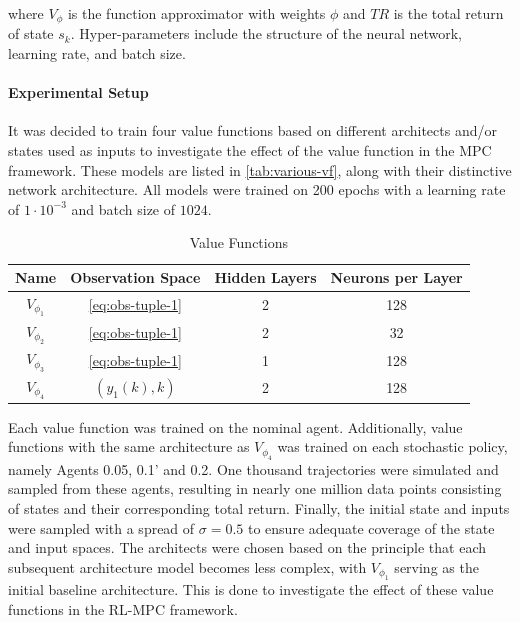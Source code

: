 where $V_{\phi}$ is the function approximator with weights $\phi$ and $TR$ is the total return of state $s_k$. Hyper-parameters include the structure of the neural network, learning rate, and batch size.\\



\paragraph{Experimental Setup}
It was decided to train four value functions based on different architects and/or states used as inputs to investigate the effect of the value function in the MPC framework. These models are listed in \autoref{tab:various-vf}, along with their distinctive network architecture. All models were trained on 200 epochs with a learning rate of $1 \cdot 10^{-3}$ and batch size of $1024$.

\begin{table}[H]
	\centering
	\renewcommand{\arraystretch}{1.3}
	\setlength{\tabcolsep}{12pt}
	\begin{tabular}{cccc}
		\toprule
		\textbf{Name} & \textbf{Observation Space} & \textbf{Hidden Layers} & \textbf{Neurons per Layer} \\
		\midrule
		$V_{\phi_1}$ & \autoref{eq:obs-tuple-1} & 2 & 128 \\  
		$V_{\phi_2}$ & \autoref{eq:obs-tuple-1} & 2 & 32 \\  
		$V_{\phi_3}$ & \autoref{eq:obs-tuple-1} & 1 & 128 \\  
		$V_{\phi_4}$ & $(y_1(k), k)$ & 2 & 128 \\  
		\bottomrule
	\end{tabular}
	\caption{Value Functions}
	\label{tab:various-vf}
\end{table}
Each value function was trained on the nominal agent. Additionally, value functions with the same architecture as $V_{\phi_4}$ was trained on each stochastic policy, namely Agents 0.05, 0.1’ and 0.2. One thousand trajectories were simulated and sampled from these agents, resulting in nearly one million data points consisting of states and their corresponding total return. Finally, the initial state and inputs were sampled with a spread of $\sigma = 0.5$ to ensure adequate coverage of the state and input spaces. The architects were chosen based on the principle that each subsequent architecture model becomes less complex, with $V_{\phi_1}$ serving as the initial baseline architecture. This is done to investigate the effect of these value functions in the RL-MPC framework.


